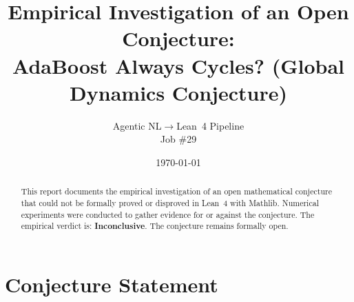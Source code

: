 \documentclass[11pt]{article}
\title{Empirical Investigation of an Open Conjecture:\\
AdaBoost Always Cycles? (Global Dynamics Conjecture)}
\author{Agentic NL$\to$Lean~4 Pipeline \\ \small Job \#29}
\date{\today}
\begin{document}
\maketitle

\begin{abstract}
This report documents the empirical investigation of an open mathematical conjecture
that could not be formally proved or disproved in Lean~4 with Mathlib.
Numerical experiments were conducted to gather evidence for or against the conjecture.
The empirical verdict is: \textbf{\textcolor{orange!80!black}{Inconclusive}}.
The conjecture remains formally open.
\end{abstract}

\section{Conjecture Statement}
\end{document}
